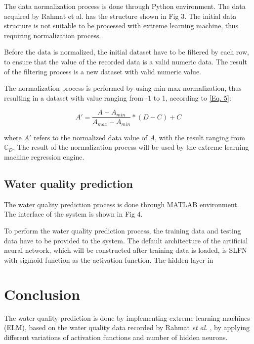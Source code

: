 \documentclass{ws-ijait}
\begin{document}
The data normalization process is done through Python environment. The data acquired by Rahmat et al.\cite{16} has the structure shown in Fig 3. The initial data structure is not suitable to be processed with extreme learning machine, thus requiring normalization process.

Before the data is normalized, the initial dataset have to be filtered by each row, to ensure that the value of the recorded data is a valid numeric data. The result of the filtering process is a new dataset with valid numeric value.

The normalization process is performed by using min-max normalization\cite{22}, thus resulting in a dataset with value ranging from -1 to 1, according to \eqref{Eq. 5}:

\begin{equation}
A' = \frac{A - A_{min}}{A_{max} - A_{min}} * (D - C) + C\label{Eq. 5}
\end{equation}

where $A'$ refers to the normalized data value of $A$, with the result ranging from $\mathbb{C}_{D}$. The result of the normalization process will be used by the extreme learning machine regression engine\cite{25}.

\subsection{Water quality prediction}

The water quality prediction process is done through MATLAB environment. The interface of the system is shown in Fig 4.


To perform the water quality prediction process, the training data and testing data have to be provided to the system. The default architecture of the artificial neural network, which will be constructed after training data is loaded, is SLFN with sigmoid function as the activation function. The hidden layer in 

\section{Conclusion}

The water quality prediction is done by implementing extreme learning machines (ELM), based on the water quality data recorded by Rahmat {\it et al.}\cite{16} , by applying different variations of activation functions and number of hidden neurons.
\end{document}
